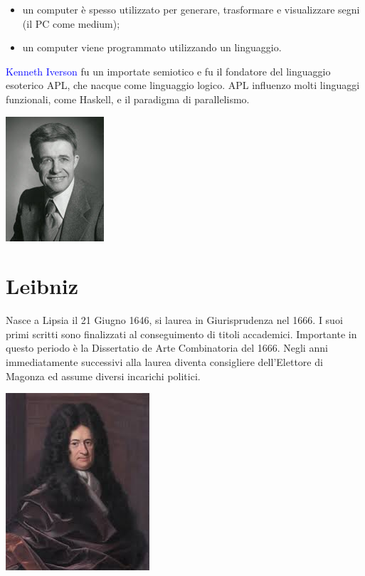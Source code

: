 \begin{itemize}
    \item un computer è spesso utilizzato per generare, trasformare e visualizzare segni (il PC come medium);
    \item un computer viene programmato utilizzando un linguaggio.
\end{itemize}

\textcolor{blue}{Kenneth Iverson} fu un importate semiotico e fu il fondatore del linguaggio esoterico APL, che nacque come linguaggio logico. APL influenzo molti linguaggi funzionali, come Haskell, e il paradigma di parallelismo.

\begin{center}
    \includegraphics[scale = 1]{images/iverson.jpg}
\end{center}


\section{Leibniz}

Nasce a Lipsia il 21 Giugno 1646, si laurea in Giurisprudenza nel 1666.
I suoi primi scritti sono finalizzati al conseguimento di titoli accademici. Importante in
questo periodo è la Dissertatio de Arte Combinatoria del 1666.
Negli anni immediatamente successivi alla laurea diventa consigliere dell’Elettore di
Magonza ed assume diversi incarichi politici.

\begin{center}
\includegraphics[scale = 0.7]{images/Leibniz.jpg}
\end{center}


